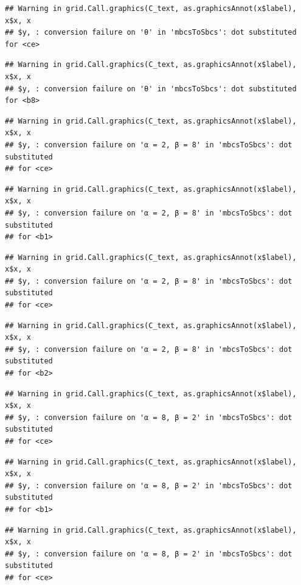 \documentclass[]{book}
\theoremstyle{definition}
\theoremstyle{definition}
\theoremstyle{definition}
\theoremstyle{remark}
\begin{document}
\begin{verbatim}
## Warning in grid.Call.graphics(C_text, as.graphicsAnnot(x$label), x$x, x
## $y, : conversion failure on 'θ' in 'mbcsToSbcs': dot substituted for <ce>
\end{verbatim}

\begin{verbatim}
## Warning in grid.Call.graphics(C_text, as.graphicsAnnot(x$label), x$x, x
## $y, : conversion failure on 'θ' in 'mbcsToSbcs': dot substituted for <b8>
\end{verbatim}

\begin{verbatim}
## Warning in grid.Call.graphics(C_text, as.graphicsAnnot(x$label), x$x, x
## $y, : conversion failure on 'α = 2, β = 8' in 'mbcsToSbcs': dot substituted
## for <ce>
\end{verbatim}

\begin{verbatim}
## Warning in grid.Call.graphics(C_text, as.graphicsAnnot(x$label), x$x, x
## $y, : conversion failure on 'α = 2, β = 8' in 'mbcsToSbcs': dot substituted
## for <b1>
\end{verbatim}

\begin{verbatim}
## Warning in grid.Call.graphics(C_text, as.graphicsAnnot(x$label), x$x, x
## $y, : conversion failure on 'α = 2, β = 8' in 'mbcsToSbcs': dot substituted
## for <ce>
\end{verbatim}

\begin{verbatim}
## Warning in grid.Call.graphics(C_text, as.graphicsAnnot(x$label), x$x, x
## $y, : conversion failure on 'α = 2, β = 8' in 'mbcsToSbcs': dot substituted
## for <b2>
\end{verbatim}

\begin{verbatim}
## Warning in grid.Call.graphics(C_text, as.graphicsAnnot(x$label), x$x, x
## $y, : conversion failure on 'α = 8, β = 2' in 'mbcsToSbcs': dot substituted
## for <ce>
\end{verbatim}

\begin{verbatim}
## Warning in grid.Call.graphics(C_text, as.graphicsAnnot(x$label), x$x, x
## $y, : conversion failure on 'α = 8, β = 2' in 'mbcsToSbcs': dot substituted
## for <b1>
\end{verbatim}

\begin{verbatim}
## Warning in grid.Call.graphics(C_text, as.graphicsAnnot(x$label), x$x, x
## $y, : conversion failure on 'α = 8, β = 2' in 'mbcsToSbcs': dot substituted
## for <ce>
\end{verbatim}
\end{document}
